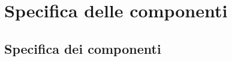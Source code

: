 \section{Specifica delle componenti}
\label{sec:Specifica delle componenti}

\subsection{Specifica dei componenti}
\label{sub:Specifica dei componenti}


